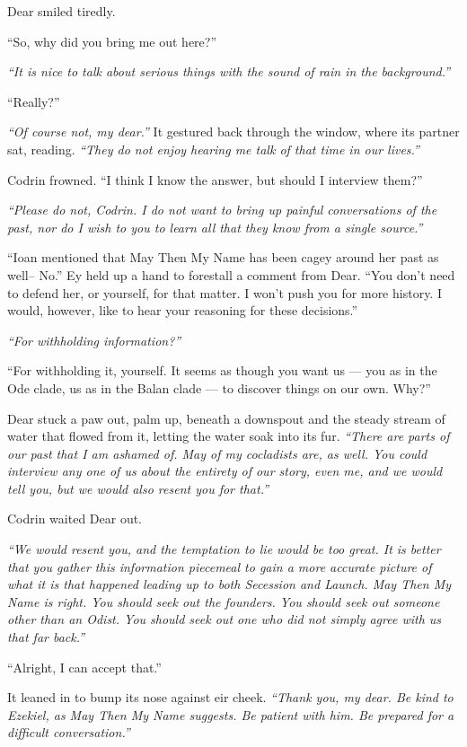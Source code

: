 Dear smiled tiredly.

``So, why did you bring me out here?''

\emph{``It is nice to talk about serious things with the sound of rain in the background.''}

``Really?''

\emph{``Of course not, my dear.''} It gestured back through the window, where its partner sat, reading. \emph{``They do not enjoy hearing me talk of that time in our lives.''}

Codrin frowned. ``I think I know the answer, but should I interview them?''

\emph{``Please do not, Codrin. I do not want to bring up painful conversations of the past, nor do I wish to you to learn all that they know from a single source.''}

``Ioan mentioned that May Then My Name has been cagey around her past as well-- No.'' Ey held up a hand to forestall a comment from Dear. ``You don't need to defend her, or yourself, for that matter. I won't push you for more history. I would, however, like to hear your reasoning for these decisions.''

\emph{``For withholding information?''}

``For withholding it, yourself. It seems as though you want us — you as in the Ode clade, us as in the Balan clade — to discover things on our own. Why?''

Dear stuck a paw out, palm up, beneath a downspout and the steady stream of water that flowed from it, letting the water soak into its fur. \emph{``There are parts of our past that I am ashamed of. May of my cocladists are, as well. You could interview any one of us about the entirety of our story, even me, and we would tell you, but we would also resent you for that.''}

Codrin waited Dear out.

\emph{``We would resent you, and the temptation to lie would be too great. It is better that you gather this information piecemeal to gain a more accurate picture of what it is that happened leading up to both Secession and Launch. May Then My Name is right. You should seek out the founders. You should seek out someone other than an Odist. You should seek out one who did not simply agree with us that far back.''}

``Alright, I can accept that.''

It leaned in to bump its nose against eir cheek. \emph{``Thank you, my dear. Be kind to Ezekiel, as May Then My Name suggests. Be patient with him. Be prepared for a difficult conversation.''}

